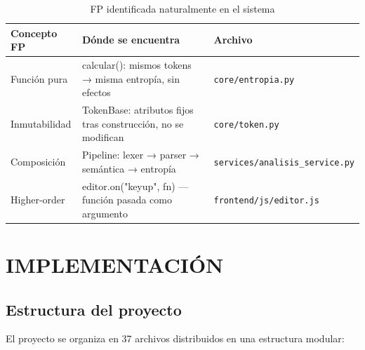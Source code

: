 \documentclass[12pt,a4paper]{article}
\begin{document}
\begin{table}[H]
\centering
\footnotesize
\caption{FP identificada naturalmente en el sistema}
\label{tab:fp_natural}
\begin{tabular}{@{}>{\raggedright\arraybackslash}p{2.2cm}>{\raggedright\arraybackslash}p{4.2cm}>{\raggedright\arraybackslash}p{5.6cm}@{}}
\toprule
\textbf{Concepto FP} & \textbf{Dónde se encuentra} & \textbf{Archivo} \\
\midrule
Función pura & calcular(): mismos tokens → misma entropía, sin efectos & \texttt{core/entropia.py} \\
Inmutabilidad & TokenBase: atributos fijos tras construcción, no se modifican & \texttt{core/token.py} \\
Composición & Pipeline: lexer → parser → semántica → entropía & \texttt{services/}\linebreak\texttt{analisis\_service.py} \\
Higher-order & editor.on("keyup", fn) — función pasada como argumento & \texttt{frontend/js/}\linebreak\texttt{editor.js} \\
\bottomrule
\end{tabular}
\end{table}

\section{IMPLEMENTACIÓN}

\subsection{Estructura del proyecto}

El proyecto se organiza en 37 archivos distribuidos en una estructura modular:
\end{document}

